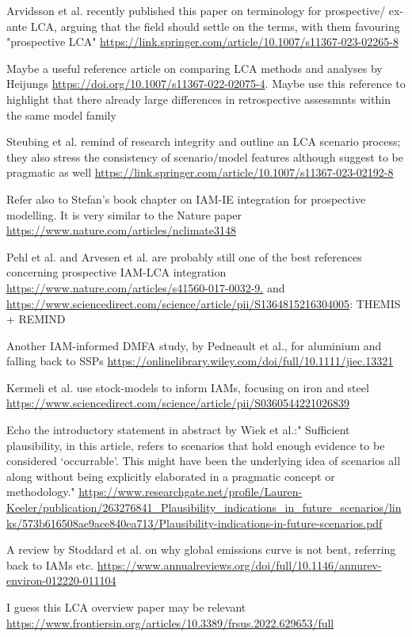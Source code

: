 \documentclass{article}
\begin{document}
Arvidsson et al. recently published this paper on terminology for prospective/ ex-ante LCA, arguing that the field should settle on the terms, with them favouring "prospective LCA" \url{https://link.springer.com/article/10.1007/s11367-023-02265-8}

Maybe a useful reference article on comparing LCA methods and analyses by Heijungs \url{https://doi.org/10.1007/s11367-022-02075-4}. Maybe use this reference to highlight that there already large differences in retrospective assessmnts within the same model family

Steubing et al. remind of research integrity and outline an LCA scenario process; they also stress the consistency of scenario/model features although suggest to be pragmatic as well \url{https://link.springer.com/article/10.1007/s11367-023-02192-8}

Refer also to Stefan's book chapter on IAM-IE integration for prospective modelling. It is very similar to the Nature paper \url{https://www.nature.com/articles/nclimate3148}

Pehl et al. and Arvesen et al. are probably still one of the best references concerning prospective IAM-LCA integration \url{https://www.nature.com/articles/s41560-017-0032-9.} and \url{https://www.sciencedirect.com/science/article/pii/S1364815216304005}: THEMIS + REMIND

Another IAM-informed DMFA study, by Pedneault et al., for aluminium and falling back to SSPs \url{https://onlinelibrary.wiley.com/doi/full/10.1111/jiec.13321}

Kermeli et al. use stock-models to inform IAMs, focusing on iron and steel \url{https://www.sciencedirect.com/science/article/pii/S0360544221026839}

Echo the introductory statement in abstract by Wiek et al.:" Sufficient plausibility, in this article, refers to scenarios that hold enough evidence to be considered ‘occurrable’. This might have been the underlying idea of scenarios all along without being explicitly elaborated in a pragmatic concept or methodology." \url{https://www.researchgate.net/profile/Lauren-Keeler/publication/263276841_Plausibility_indications_in_future_scenarios/links/573b616508ae9ace840ea713/Plausibility-indications-in-future-scenarios.pdf}

A review by Stoddard et al. on why global emissions curve is not bent, referring back to IAMs etc. \url{https://www.annualreviews.org/doi/full/10.1146/annurev-environ-012220-011104} 

I guess this LCA overview paper may be relevant \url{https://www.frontiersin.org/articles/10.3389/frsus.2022.629653/full}
\end{document}
